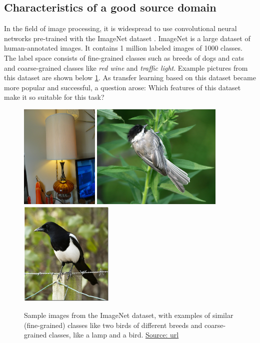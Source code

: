 \documentclass[a4paper,11pt,twoside]{report}
\theoremstyle{definition}
\begin{document}
\subsection{Characteristics of a good source domain}

In the field of image processing, it is widespread to use convolutional neural networks \mbox{pre-trained} with the ImageNet dataset \cite{imagnet}.  ImageNet is a large dataset of human-annotated images. It contains 1 million labeled images of 1000 classes. The label space consists of fine-grained classes such as breeds of dogs and cats and coarse-grained classes like \textit{red wine} and \textit{traffic light}. Example pictures from this dataset are shown below \ref{fig:image_net}. As transfer learning based on this dataset became more popular and successful, a question arose: Which features of this dataset make it so suitable for this task?
\FloatBarrier

\begin{figure}[h!]
\centering
\includegraphics[height=5cm]{imgs/lamp.jpeg}
\includegraphics[height=5cm]{imgs/bird1.jpeg}
\includegraphics[height=5cm]{imgs/bird2.jpeg}
\caption{Sample images from the ImageNet dataset, with examples of similar (fine-grained) classes like two birds of different breeds and coarse-grained classes, like a lamp and a bird. \href{https://www.kaggle.com/competitions/imagenet-object-localization-challenge/data}{Source: url}}
\label{fig:image_net}
\end{figure}
\end{document}
